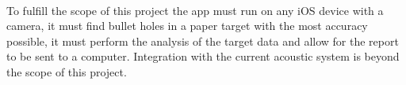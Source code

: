 \paragraph{}To fulfill the scope of this project the app must run on any iOS device with a camera, it must find bullet holes in a paper target with the most accuracy possible, it must perform the analysis of the target data and allow for the report to be sent to a computer. Integration with the current acoustic system is beyond the scope of this project.
